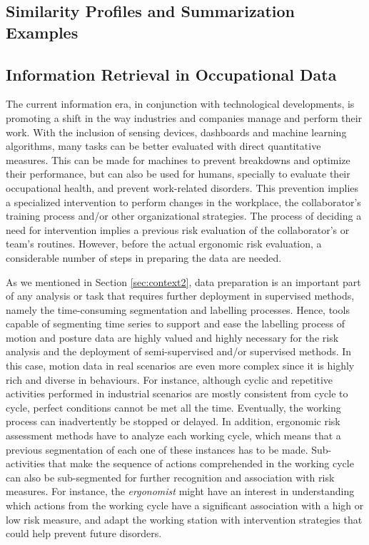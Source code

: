 \subsection{Similarity Profiles and Summarization Examples}
\label{results:summarize}


\subsection{Information Retrieval in Occupational Data}
\label{subsec:occupationa_examples}

The current information era, in conjunction with technological developments, is promoting a shift in the way industries and companies manage and perform their work. With the inclusion of sensing devices, dashboards and machine learning algorithms, many tasks can be better evaluated with direct quantitative measures. This can be made for machines to prevent breakdowns and optimize their performance, but can also be used for humans, specially to evaluate their occupational health, and prevent work-related disorders. This prevention implies a specialized intervention to perform changes in the workplace, the collaborator's training process and/or other organizational strategies. The process of deciding a need for intervention implies a previous risk evaluation of the collaborator's or team's routines. However, before the actual ergonomic risk evaluation, a considerable number of steps in preparing the data are needed. 

As we mentioned in Section \ref{sec:context2}, data preparation is an important part of any analysis or task that requires further deployment in supervised methods, namely the time-consuming segmentation and labelling processes. Hence, tools capable of segmenting time series to support and ease the labelling process of motion and posture data are highly valued and highly necessary for the risk analysis and the deployment of semi-supervised and/or supervised methods. In this case, motion data in real scenarios are even more complex since it is highly rich and diverse in behaviours. For instance, although cyclic and repetitive activities performed in industrial scenarios are mostly consistent from cycle to cycle, perfect conditions cannot be met all the time. Eventually, the working process can inadvertently be stopped or delayed. In addition, ergonomic risk assessment methods have to analyze each working cycle, which means that a previous segmentation of each one of these instances has to be made. Sub-activities that make the sequence of actions comprehended in the working cycle can also be sub-segmented for further recognition and association with risk measures. For instance, the \textit{ergonomist} might have an interest in understanding which actions from the working cycle have a significant association with a high or low risk measure, and adapt the working station with intervention strategies that could help prevent future disorders. 


